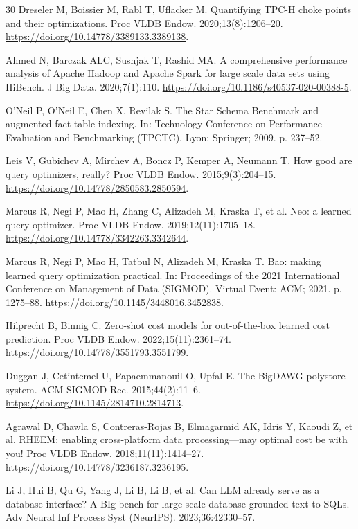 \documentclass[10pt,a4paper]{article}
\begin{document}
{\begin{thebibliography}{30}
Dreseler M, Boissier M, Rabl T, Uflacker M. Quantifying TPC-H choke points and their optimizations. Proc VLDB Endow. 2020;13(8):1206--20. \url{https://doi.org/10.14778/3389133.3389138}.

Ahmed N, Barczak ALC, Susnjak T, Rashid MA. A comprehensive performance analysis of Apache Hadoop and Apache Spark for large scale data sets using HiBench. J Big Data. 2020;7(1):110. \url{https://doi.org/10.1186/s40537-020-00388-5}.

O'Neil P, O'Neil E, Chen X, Revilak S. The Star Schema Benchmark and augmented fact table indexing. In: Technology Conference on Performance Evaluation and Benchmarking (TPCTC). Lyon: Springer; 2009. p. 237--52.

Leis V, Gubichev A, Mirchev A, Boncz P, Kemper A, Neumann T. How good are query optimizers, really? Proc VLDB Endow. 2015;9(3):204--15. \url{https://doi.org/10.14778/2850583.2850594}.

Marcus R, Negi P, Mao H, Zhang C, Alizadeh M, Kraska T, et al. Neo: a learned query optimizer. Proc VLDB Endow. 2019;12(11):1705--18. \url{https://doi.org/10.14778/3342263.3342644}.

Marcus R, Negi P, Mao H, Tatbul N, Alizadeh M, Kraska T. Bao: making learned query optimization practical. In: Proceedings of the 2021 International Conference on Management of Data (SIGMOD). Virtual Event: ACM; 2021. p. 1275--88. \url{https://doi.org/10.1145/3448016.3452838}.

Hilprecht B, Binnig C. Zero-shot cost models for out-of-the-box learned cost prediction. Proc VLDB Endow. 2022;15(11):2361--74. \url{https://doi.org/10.14778/3551793.3551799}.

Duggan J, Cetintemel U, Papaemmanouil O, Upfal E. The BigDAWG polystore system. ACM SIGMOD Rec. 2015;44(2):11--6. \url{https://doi.org/10.1145/2814710.2814713}.

Agrawal D, Chawla S, Contreras-Rojas B, Elmagarmid AK, Idris Y, Kaoudi Z, et al. RHEEM: enabling cross-platform data processing---may optimal cost be with you! Proc VLDB Endow. 2018;11(11):1414--27. \url{https://doi.org/10.14778/3236187.3236195}.

Li J, Hui B, Qu G, Yang J, Li B, Li B, et al. Can LLM already serve as a database interface? A BIg bench for large-scale database grounded text-to-SQLs. Adv Neural Inf Process Syst (NeurIPS). 2023;36:42330--57.


\end{thebibliography}}
\end{document}
